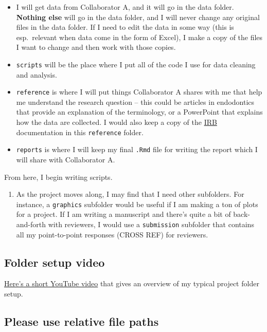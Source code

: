 \documentclass[
]{book}
\providecommand{\tightlist}{%
  \setlength{\itemsep}{0pt}\setlength{\parskip}{0pt}}
\begin{document}
\begin{itemize}
\item
  I will get data from Collaborator A, and it will go in the data folder. \textbf{Nothing else} will go in the data folder, and I will never change any original files in the data folder. If I need to edit the data in some way (this is esp.~relevant when data come in the form of Excel), I make a copy of the files I want to change and then work with those copies.
\item
  \texttt{scripts} will be the place where I put all of the code I use for data cleaning and analysis.
\item
  \texttt{reference} is where I will put things Collaborator A shares with me that help me understand the research question -- this could be articles in endodontics that provide an explanation of the terminology, or a PowerPoint that explains how the data are collected. I would also keep a copy of the \href{https://www.fda.gov/regulatory-information/search-fda-guidance-documents/institutional-review-boards-frequently-asked-questions}{IRB} documentation in this \texttt{reference} folder.
\item
  \texttt{reports} is where I will keep my final \texttt{.Rmd} file for writing the report which I will share with Collaborator A.
\end{itemize}

From here, I begin writing scripts.

\begin{enumerate}
\def\labelenumi{\arabic{enumi}.}
\setcounter{enumi}{4}
\tightlist
\item
  As the project moves along, I may find that I need other subfolders. For instance, a \texttt{graphics} subfolder would be useful if I am making a ton of plots for a project. If I am writing a manuscript and there's quite a bit of back-and-forth with reviewers, I would use a \texttt{submission} subfolder that contains all my point-to-point responses (CROSS REF) for reviewers.
\end{enumerate}

\hypertarget{folder-video}{%
\subsection{Folder setup video}\label{folder-video}}

\href{https://youtu.be/4UxoLIOmkzc}{Here's a short YouTube video} that gives an overview of my typical project folder setup.

\hypertarget{please-use-relative-file-paths}{%
\subsection{Please use relative file paths}\label{please-use-relative-file-paths}}
\end{document}
